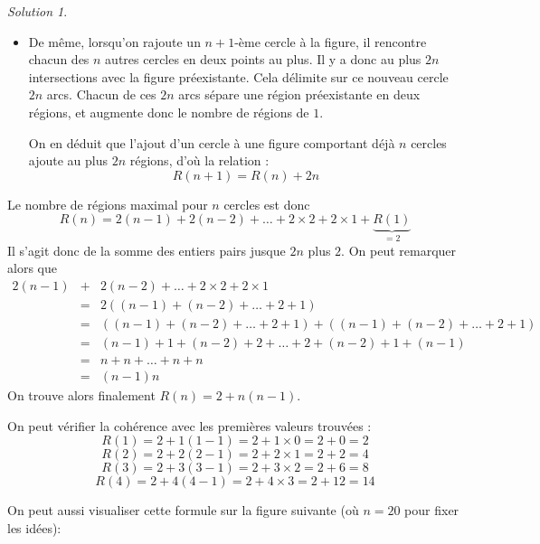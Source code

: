 \documentclass[14pt]{article}
\theoremstyle{remark}
\newtheorem*{sol}{Solution}
\newcounter{n}
\theoremstyle{plain}
\begin{document}
\begin{sol}
\begin{itemize}
\begin{figure}[H]\center{}
\caption{L'arc bleu coupe l'intérieur du cercle noir en deux zones (1 et 3) et l'extérieur en deux zones (2 et 4), ce qui rajoute bien deux zones.}
\end{figure}
\item De même, lorsqu'on rajoute un $n+1$-ème cercle à la figure, il rencontre chacun des $n$ autres cercles en deux points au plus. Il y a donc au plus $2n$ intersections avec la figure préexistante. Cela délimite sur ce nouveau cercle $2n$ arcs. Chacun de ces $2n$ arcs sépare une région préexistante en deux régions, et augmente donc le nombre de régions de $1$. 

On en déduit que l'ajout d'un cercle à une figure comportant déjà $n$ cercles ajoute au plus $2n$ régions, d'où la relation : 
\[R(n+1) = R(n) + 2n\]
\end{itemize}

Le nombre de régions maximal pour $n$ cercles est donc 
\[R(n) = 2(n-1) + 2(n-2) + \ldots + 2\times 2 + 2\times 1 + \underbrace{R(1)}_{=2}\]
Il s'agit donc de la somme des entiers pairs jusque $2n$ plus $2$. 
On peut remarquer alors que 
\begin{eqnarray*} 2(n-1) &+& 2(n-2) + \ldots + 2\times 2 + 2\times 1 \\&=& 2(  (n-1) + (n-2) + \ldots + 2 + 1 ) \\
&=& ( (n-1) + (n-2) + \ldots + 2 + 1)+ ((n-1) + (n-2) + \ldots + 2 + 1)\\
&=&  (n-1) + 1  + (n-2) + 2 +\ldots + 2 + (n-2) + 1 + (n-1)\\
&=& n + n + \ldots + n + n \\
&=& (n-1)n
\end{eqnarray*}
On trouve alors finalement $R(n)=2+n(n-1)$. 

On peut vérifier la cohérence avec les premières valeurs trouvées : 
\[R(1) = 2+ 1(1-1) = 2+ 1\times 0 = 2+0=2\]
\[R(2) = 2+2(2-1) = 2+2\times 1 = 2+2 = 4\]
\[R(3) = 2+3(3-1)=2+3\times2 = 2+6 = 8\]
\[R(4) = 2+4(4-1) = 2+4\times3 = 2+12=14\]

On peut aussi visualiser cette formule sur la figure suivante (où $n=20$ pour fixer les idées): 


\end{sol}
\end{document}
